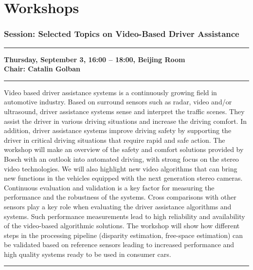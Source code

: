 \part{Workshops}

\section{{\bf  Session: %
Selected Topics on Video-Based Driver Assistance
}}\vspace{-15pt}%


\noindent \noindent\rule{\textwidth}{0.4pt}
{\bf  \noindent  Thursday, September 3, 16:00 -- 18:00, Beijing Room
} \\ \nopagebreak
{\bf  Chair: 
Catalin Golban
} \\ \nopagebreak
\noindent\rule{\textwidth}{0.4pt}

Video based driver assistance systems is a continuously growing field in automotive industry. 
Based on surround sensors such as radar, video and/or ultrasound, driver assistance systems sense and interpret the traffic scenes. 
They assist the driver in various driving situations and increase the driving comfort. 
In addition, driver assistance systems improve driving safety by supporting the driver in critical driving situations that require rapid and safe action.
The workshop will make an overview of the safety and comfort solutions provided by Bosch with an outlook into automated driving, 
with strong focus on the stereo video technologies. 
We will also highlight new video algorithms that can bring new functions in the vehicles equipped with the next generation stereo cameras.
Continuous evaluation and validation is a key factor for measuring the performance and the robustness of the systems. 
Cross comparisons with other sensors play a key role when evaluating the driver assistance algorithms and systems.
Such performance measurements lead to high reliability and availability of the video-based algorithmic solutions.
The workshop will show how different steps in the processing pipeline (disparity estimation, free-space estimation)
can be validated based on reference sensors leading to increased performance and high quality systems ready to be used in consumer cars.
\\
\noindent\rule{\textwidth}{0.4pt}


\vspace*{-36pt}\subsection[ 
    	   {\bf Video-based driver assistance solutions: overview and outlook into autonomous driving solutions
           } \\
           {\it Catalin Golban
           }
	]
	    {
            }

